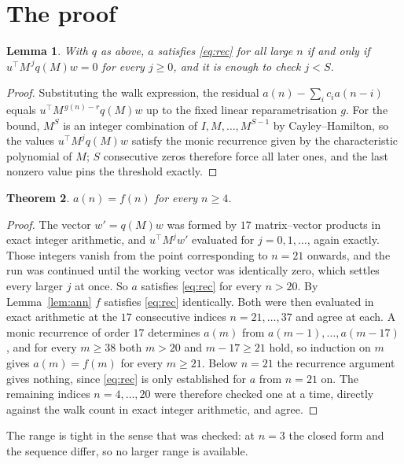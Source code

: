 \documentclass[11pt,a4paper]{article}
\theoremstyle{plain}
\newtheorem{theorem}{Theorem}
\newtheorem{lemma}[theorem]{Lemma}
\theoremstyle{definition}
\begin{document}
\section{The proof}

\begin{lemma}\label{lem:crit}
With $q$ as above, $a$ satisfies \eqref{eq:rec} for all large $n$ if and only if
$u^{\!\top}M^{\,j}q(M)w=0$ for every $j\ge0$, and it is enough to check $j<S$.
\end{lemma}

\begin{proof}
Substituting the walk expression, the residual $a(n)-\sum_ic_ia(n-i)$ equals
$u^{\!\top}M^{\,g(n)-r}q(M)w$ up to the fixed linear reparametrisation $g$. For the bound,
$M^{S}$ is an integer combination of $I,M,\dots,M^{S-1}$ by Cayley--Hamilton, so the values
$u^{\!\top}M^{j}q(M)w$ satisfy the monic recurrence given by the characteristic polynomial of
$M$; $S$ consecutive zeros therefore force all later ones, and the last nonzero value pins the
threshold exactly.
\end{proof}

\begin{theorem}
$a(n)=f(n)$ for every $n\ge4$.
\end{theorem}

\begin{proof}
The vector $w'=q(M)w$ was formed by $17$ matrix--vector products in exact integer
arithmetic, and $u^{\!\top}M^{j}w'$ evaluated for $j=0,1,\dots$, again exactly. Those integers
vanish from the point corresponding to $n=21$ onwards, and the run was continued until the
working vector was identically zero, which settles every larger $j$ at once. So $a$ satisfies
\eqref{eq:rec} for every $n>20$. By Lemma~\ref{lem:ann} $f$ satisfies \eqref{eq:rec}
identically. Both were then evaluated in exact arithmetic at the $17$ consecutive indices
$n=21,\dots,37$ and agree at each. A monic recurrence of order $17$
determines $a(m)$ from $a(m-1),\dots,a(m-17)$, and for every $m\ge38$ both
$m>20$ and $m-17\ge21$ hold, so induction on $m$ gives $a(m)=f(m)$ for every
$m\ge21$.
Below $n=21$ the recurrence argument gives nothing, since \eqref{eq:rec} is only
established for $a$ from $n=21$ on. The remaining indices $n=4,\dots,20$ were
therefore checked one at a time, directly against the walk count in exact integer arithmetic,
and agree.
\end{proof}

The range is tight in the sense that was checked: at $n=3$ the closed form and the sequence differ, so no larger range is available.
\end{document}
